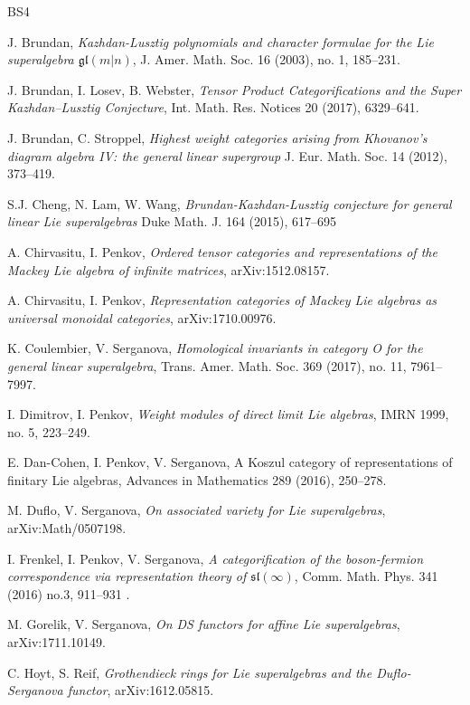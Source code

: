 \documentclass[12pt,oneside,english]{amsart}
\numberwithin{equation}{section}
\numberwithin{figure}{section}
\theoremstyle{plain}
\theoremstyle{plain}
\theoremstyle{remark}
\theoremstyle{definition}
\theoremstyle{plain}
\theoremstyle{remark}
\theoremstyle{definition}
\theoremstyle{plain}
\theoremstyle{plain}
\theoremstyle{definition}
\begin{document}
\begin{thebibliography}{BS4}


 J. Brundan, {\it Kazhdan-Lusztig polynomials and character formulae for the Lie superalgebra $\mathfrak{gl}(m|n)$}, J. Amer. Math. Soc. 16 (2003), no. 1, 185--231.


 J. Brundan, I. Losev, B. Webster, {\it Tensor Product Categorifications and the Super Kazhdan--Lusztig Conjecture},	Int. Math. Res. Notices 20 (2017), 6329--641.


 J. Brundan, C. Stroppel, {\it Highest weight categories arising from Khovanov's diagram algebra IV: the general linear supergroup} J. Eur. Math. Soc. 14 (2012), 373--419.

 S.J. Cheng, N. Lam, W. Wang, {\it Brundan-Kazhdan-Lusztig conjecture for general linear Lie superalgebras} Duke Math. J. 164 (2015), 617--695

  A. Chirvasitu, I. Penkov, {\it Ordered tensor categories and representations of the Mackey Lie algebra of infinite matrices}, arXiv:1512.08157.


 A. Chirvasitu, I. Penkov, {\it Representation categories of Mackey Lie algebras as universal monoidal categories}, arXiv:1710.00976.


  K. Coulembier, V. Serganova, {\it Homological invariants in category O for the general linear superalgebra}, Trans. Amer. Math. Soc. 369 (2017), no. 11, 7961--7997.


 I. Dimitrov, I. Penkov, {\it Weight modules of direct limit Lie algebras}, IMRN 1999, no. 5, 223--249.


 E. Dan-Cohen, I. Penkov, V. Serganova,  A Koszul category of representations of finitary Lie algebras, Advances in Mathematics {289} (2016), 250--278.



 M. Duflo, V. Serganova, \emph{On associated variety for Lie superalgebras}, arXiv:Math/0507198.


 I. Frenkel, I. Penkov, V. Serganova, {\it A categorification of the boson-fermion correspondence via representation theory of $\mathfrak{sl}(\infty)$}, Comm. Math. Phys. 341 (2016) no.3, 911--931 .

 M. Gorelik, V. Serganova, {\it On DS functors for affine Lie superalgebras}, arXiv:1711.10149.


 C. Hoyt, S. Reif, {\it Grothendieck rings for Lie superalgebras and the Duflo-Serganova functor}, arXiv:1612.05815.



\end{thebibliography}
\end{document}
